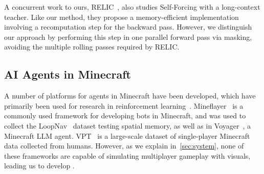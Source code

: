 A concurrent work to ours, RELIC~\cite{hong2025relic}, also studies Self-Forcing with a long-context teacher. Like our method, they propose a memory-efficient implementation involving a recomputation step for the backward pass. However, we distinguish our approach by performing this step in one parallel forward pass via masking, avoiding the multiple rolling passes required by RELIC.

\subsection{AI Agents in Minecraft}

A number of platforms for agents in Minecraft have been developed, which have primarily been used for research in reinforcement learning~\cite{johnson2016malmo, fan2022minedojo, guss2019minerllargescaledatasetminecraft}. Mineflayer~\cite{mineflayer2025} is a commonly used framework for developing bots in Minecraft, and was used to collect the LoopNav~\cite{lian2025toward} dataset testing spatial memory, as well as in Voyager~\cite{wang2023voyager}, a Minecraft LLM agent. VPT~\cite{baker2022videopretrainingvptlearning} is a large-scale dataset of single-player Minecraft data collected from humans. However, as we explain in~\cref{sec:system}, none of these frameworks are capable of simulating multiplayer gameplay with visuals, leading us to develop \solarisengine. 
